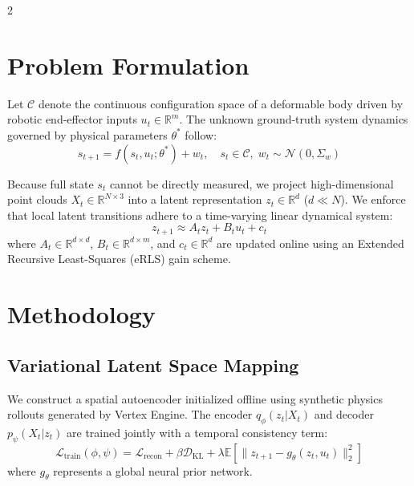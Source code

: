 \documentclass[10pt, a4paper]{scrartcl}
\begin{document}
\begin{multicols}{2}
\begin{center}
\begin{tcolorbox}[
    colback=lightbg,
    colframe=boxborder,
    arc=2mm,
    boxrule=0.6pt,
    left=4pt, right=4pt, top=6pt, bottom=4pt
  ]
    \label{fig:pipeline}
  \end{tcolorbox}
\end{center}

\section{Problem Formulation}
Let $\mathcal{C}$ denote the continuous configuration space of a deformable body driven by robotic end-effector inputs $u_t \in \mathbb{R}^m$. The unknown ground-truth system dynamics governed by physical parameters $\theta^*$ follow:
\begin{equation}
  s_{t+1} = f(s_t, u_t; \theta^*) + w_t, \quad s_t \in \mathcal{C}, \; w_t \sim \mathcal{N}(0, \Sigma_w)
\end{equation}

Because full state $s_t$ cannot be directly measured, we project high-dimensional point clouds $X_t \in \mathbb{R}^{N \times 3}$ into a latent representation $z_t \in \mathbb{R}^d$ ($d \ll N$). We enforce that local latent transitions adhere to a time-varying linear dynamical system:
\begin{equation}
  z_{t+1} \approx A_t z_t + B_t u_t + c_t
\end{equation}
where $A_t \in \mathbb{R}^{d \times d}$, $B_t \in \mathbb{R}^{d \times m}$, and $c_t \in \mathbb{R}^d$ are updated online using an Extended Recursive Least-Squares (eRLS) gain scheme.

\section{Methodology}

\subsection{Variational Latent Space Mapping}
We construct a spatial autoencoder initialized offline using synthetic physics rollouts generated by Vertex Engine. The encoder $q_\phi(z_t | X_t)$ and decoder $p_\psi(X_t | z_t)$ are trained jointly with a temporal consistency term:
\begin{equation}
  \mathcal{L}_{\text{train}}(\phi, \psi) = \mathcal{L}_{\text{recon}} + \beta \mathcal{D}_{\text{KL}} + \lambda \mathbb{E} \left[ \| z_{t+1} - g_\theta(z_t, u_t) \|^2_2 \right]
\end{equation}
where $g_\theta$ represents a global neural prior network.


\end{multicols}
\end{document}
